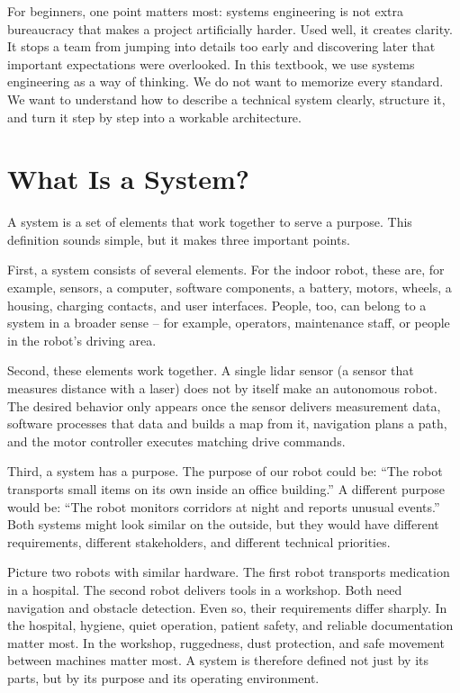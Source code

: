 For beginners, one point matters most: systems engineering is not extra bureaucracy that makes a project artificially harder. Used well, it creates clarity. It stops a team from jumping into details too early and discovering later that important expectations were overlooked. In this textbook, we use systems engineering as a way of thinking. We do not want to memorize every standard. We want to understand how to describe a technical system clearly, structure it, and turn it step by step into a workable architecture.

\section{What Is a System?}
A system is a set of elements that work together to serve a purpose. This definition sounds simple, but it makes three important points.

First, a system consists of several elements. For the indoor robot, these are, for example, sensors, a computer, software components, a battery, motors, wheels, a housing, charging contacts, and user interfaces. People, too, can belong to a system in a broader sense -- for example, operators, maintenance staff, or people in the robot's driving area.

Second, these elements work together. A single lidar sensor (a sensor that measures distance with a laser) does not by itself make an autonomous robot. The desired behavior only appears once the sensor delivers measurement data, software processes that data and builds a map from it, navigation plans a path, and the motor controller executes matching drive commands.

Third, a system has a purpose. The purpose of our robot could be: \enquote{The robot transports small items on its own inside an office building.} A different purpose would be: \enquote{The robot monitors corridors at night and reports unusual events.} Both systems might look similar on the outside, but they would have different requirements, different stakeholders, and different technical priorities.

\begin{praxisbox}
Picture two robots with similar hardware. The first robot transports medication in a hospital. The second robot delivers tools in a workshop. Both need navigation and obstacle detection. Even so, their requirements differ sharply. In the hospital, hygiene, quiet operation, patient safety, and reliable documentation matter most. In the workshop, ruggedness, dust protection, and safe movement between machines matter most. A system is therefore defined not just by its parts, but by its purpose and its operating environment.
\end{praxisbox}

